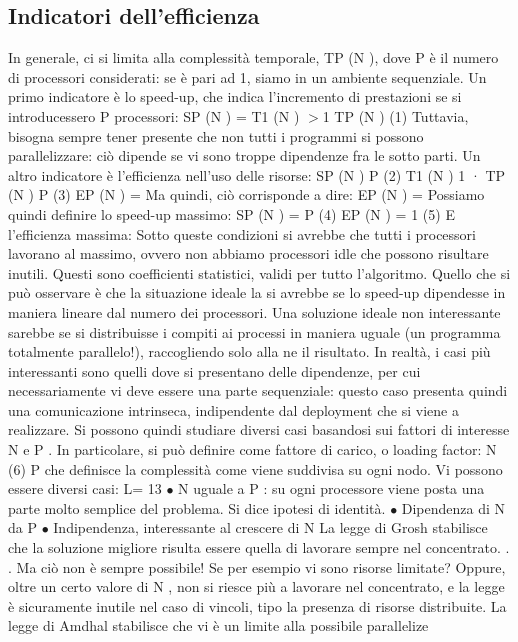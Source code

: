 \subsection{Indicatori dell'efficienza}
In generale, ci si limita alla complessità temporale, TP (N ), dove P è il numero
di processori considerati: se è pari ad 1, siamo in un ambiente sequenziale.
Un primo indicatore è lo speed-up, che indica l'incremento di prestazioni se si
introducessero P processori:
SP (N ) =
T1 (N )
$>$1
TP (N )
(1)
Tuttavia, bisogna sempre tener presente che non tutti i programmi si possono
parallelizzare: ciò dipende se vi sono troppe dipendenze fra le sotto parti.
Un altro indicatore è l'efficienza nell'uso delle risorse:
SP (N )
P
(2)
T1 (N ) 1
·
TP (N ) P
(3)
EP (N ) =
Ma quindi, ciò corrisponde a dire:
EP (N ) =
Possiamo quindi definire lo speed-up massimo:
SP (N ) = P
(4)
EP (N ) = 1
(5)
E l'efficienza massima:
Sotto queste condizioni si avrebbe che tutti i processori lavorano al massimo,
ovvero non abbiamo processori idle che possono risultare inutili. Questi sono
coefficienti statistici, validi per tutto l'algoritmo. Quello che si può osservare è
che la situazione ideale la si avrebbe se lo speed-up dipendesse in maniera lineare dal numero dei processori. Una
soluzione ideale non interessante sarebbe
se si distribuisse i compiti ai processi in maniera uguale (un programma totalmente parallelo!), raccogliendo solo alla
ne il risultato. In realtà, i casi più
interessanti sono quelli dove si presentano delle dipendenze, per cui necessariamente vi deve essere una parte
sequenziale: questo caso presenta quindi una
comunicazione intrinseca, indipendente dal deployment che si viene a realizzare.
Si possono quindi studiare diversi casi basandosi sui fattori di interesse N e
P . In particolare, si può definire come fattore di carico, o loading factor:
N
(6)
P
che definisce la complessità come viene suddivisa su ogni nodo. Vi possono
essere diversi casi:
L=
13
$\bullet$ N uguale a P : su ogni processore viene posta una parte molto semplice
del problema. Si dice ipotesi di identità.
$\bullet$ Dipendenza di N da P
$\bullet$ Indipendenza, interessante al crescere di N
La legge di Grosh stabilisce che la soluzione migliore risulta essere quella di lavorare sempre nel concentrato. . . Ma
ciò non è sempre possibile! Se per esempio
vi sono risorse limitate? Oppure, oltre un certo valore di N , non si riesce più
a lavorare nel concentrato, e la legge è sicuramente inutile nel caso di vincoli,
tipo la presenza di risorse distribuite.
La legge di Amdhal stabilisce che vi è un limite alla possibile parallelize
